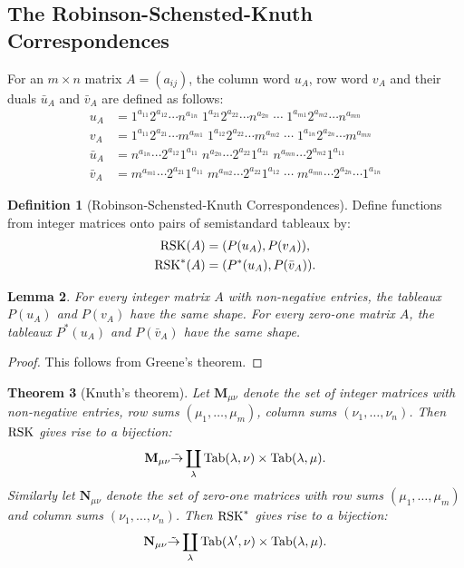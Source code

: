 \documentclass[11pt]{amsart}
\newtheorem{theorem}{Theorem}[subsection]
\newtheorem{lemma}[theorem]{Lemma}
\theoremstyle{definition}
\newtheorem{definition}[theorem]{Definition}
\theoremstyle{example}
\newcommand{\Tab}{\textup{Tab}}
\newcommand{\rsk}{\textup{RSK}}
\begin{document}
\subsection{The Robinson-Schensted-Knuth Correspondences}
\label{sec:rsk}
For an $m\times n$ matrix $A=(a_{ij})$, the column word $u_A$, row word $v_A$ and their duals $\bar u_A$ and $\bar v_A$ are defined as follows:
\begin{align*}
  u_A &= 1^{a_{11}}2^{a_{12}}\dotsb n^{a_{1n}} \; 1^{a_{21}} 2^{a_{22}} \dotsb n^{a_{2n}} \; \dotsb \; 1^{a_{m1}} 2^{a_{m2}} \dotsb n^{a_{mn}}\\
  v_A &= 1^{a_{11}}2^{a_{21}}\dotsb m^{a_{m1}} \; 1^{a_{12}} 2^{a_{22}} \dotsb m^{a_{m2}} \; \dotsb \; 1^{a_{1n}} 2^{a_{2n}} \dotsb m^{a_{mn}}\\
  \bar u_A &= n^{a_{1n}} \dotsb 2^{a_{12}}1^{a_{11}}\; n^{a_{2n}}\dotsb 2^{a_{22}}1^{a_{21}} \; n^{a_{mn}} \dotsb 2^{a_{m2}} 1^{a_{11}}\\
  \bar v _A &= m^{a_{m1}}\dotsb 2^{a_{21}}1^{a_{11}} \; m^{a_{m2}}\dotsb 2^{a_{22}} 1^{a_{12}} \; \dotsb \; m^{a_{mn}}\dotsb  2^{a_{2n}} \dotsb 1^{a_{1n}}
\end{align*}
\begin{definition}
  [Robinson-Schensted-Knuth Correspondences]
  Define functions from integer matrices onto pairs of semistandard tableaux by:
  \begin{align*}
    \rsk(A) & = (P(u_A), P(v_A)),\\
    \rsk^*(A) & = (P^*(u_A), P(\bar v_A)).
  \end{align*}
\end{definition}
\begin{lemma}
  For every integer matrix $A$ with non-negative entries, the tableaux $P(u_A)$ and $P(v_A)$ have the same shape.
  For every zero-one matrix $A$, the tableaux $P^*(u_A)$ and $P(\bar v_A)$ have the same shape.
\end{lemma}
\begin{proof}
  This follows from Greene's theorem.
\end{proof}
\begin{theorem}
  [Knuth's theorem]
  \label{theorem:knuth}
  Let $\mathbf M_{\mu\nu}$ denote the set of integer matrices with non-negative entries, row sums $(\mu_1,\dotsc, \mu_m)$, column sums $(\nu_1,\dotsc,\nu_n)$.
  Then $\rsk$ gives rise to a bijection:
  \begin{displaymath}
    \mathbf M_{\mu\nu}\tilde\to \coprod_\lambda \Tab(\lambda,\nu)\times \Tab(\lambda,\mu).
  \end{displaymath}
  Similarly let $\mathbf N_{\mu\nu}$ denote the set of zero-one matrices with row sums $(\mu_1,\dotsc, \mu_m)$ and column sums $(\nu_1,\dotsc,\nu_n)$.
  Then $\rsk^*$ gives rise to a bijection:
  \begin{displaymath}
    \mathbf N_{\mu\nu}\tilde\to \coprod_\lambda \Tab(\lambda',\nu)\times \Tab(\lambda,\mu).
  \end{displaymath}
\end{theorem}
\end{document}
